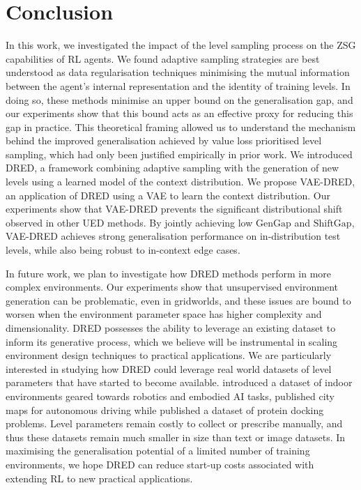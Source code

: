 \documentclass{article}
\theoremstyle{plain}
\theoremstyle{definition}
\theoremstyle{remark}
\begin{document}
\section{Conclusion}\label{sec:disc}
In this work, we investigated the impact of the level sampling process on the ZSG capabilities of RL agents. We found adaptive sampling strategies are best understood as data regularisation techniques minimising the mutual information between the agent's internal representation and the identity of training levels. In doing so, these methods minimise an upper bound on the generalisation gap, and our experiments show that this bound acts as an effective proxy for reducing this gap in practice. This theoretical framing allowed us to understand the mechanism behind the improved generalisation achieved by value loss prioritised level sampling, which had only been justified empirically in prior work. We introduced DRED, a framework combining adaptive sampling with the generation of new levels using a learned model of the context distribution. We propose VAE-DRED, an application of DRED using a VAE to learn the context distribution. Our experiments show that VAE-DRED prevents the significant distributional shift observed in other UED methods. By jointly achieving low $\text{GenGap}$ and $\text{ShiftGap}$, VAE-DRED achieves strong generalisation performance on in-distribution test levels, while also being robust to in-context edge cases.

In future work, we plan to investigate how DRED methods perform in more complex environments. Our experiments show that unsupervised environment generation can be problematic, even in gridworlds, and these issues are bound to worsen when the environment parameter space has higher complexity and dimensionality. DRED possesses the ability to leverage an existing dataset to inform its generative process, which we believe will be instrumental in scaling environment design techniques to practical applications. We are particularly interested in studying how DRED could leverage real world datasets of level parameters that have started to become available. \citet{OpenRooms} introduced a dataset of indoor environments geared towards robotics and embodied AI tasks, \citet{argoverse2} published city maps for autonomous driving while \citet{metabox,protein_meta_opt} published a dataset of protein docking problems. Level parameters remain costly to collect or prescribe manually, and thus these datasets remain much smaller in size than text or image datasets. In maximising the generalisation potential of a limited number of training environments, we hope DRED can reduce start-up costs associated with extending RL to new practical applications.
\end{document}
